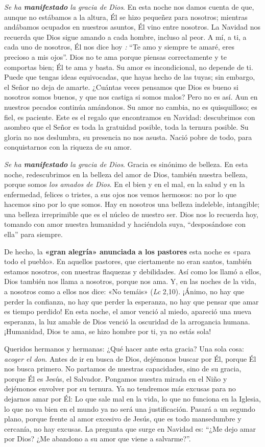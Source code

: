 \documentclass[]{article}
\begin{document}
\emph{Se ha \textbf{manifestado} la gracia de Dios}. En esta noche nos
damos cuenta de que, aunque no estábamos a la altura, Él se hizo
pequeñez para nosotros; mientras andábamos ocupados en nuestros asuntos,
Él vino entre nosotros. La Navidad nos recuerda que Dios sigue amando a
cada hombre, incluso al peor. A mí, a ti, a cada uno de nosotros, Él nos
dice hoy \emph{:} ``Te amo y siempre te amaré, eres precioso a mis
ojos''. Dios no te ama porque piensas correctamente y te comportas bien;
Él te ama y basta. Su amor es incondicional, no depende de ti. Puede que
tengas ideas equivocadas, que hayas hecho de las tuyas; sin embargo, el
Señor no deja de amarte. ¿Cuántas veces pensamos que Dios es bueno si
nosotros somos buenos, y que nos castiga si somos malos? Pero no es así.
Aun en nuestros pecados continúa amándonos. Su amor no cambia, no es
quisquilloso; es fiel, es paciente. Este es el regalo que encontramos en
Navidad: descubrimos con asombro que el Señor es toda la gratuidad
posible, toda la ternura posible. Su gloria no nos deslumbra, su
presencia no nos asusta. Nació pobre de todo, para conquistarnos con la
riqueza de su amor.

\emph{Se ha \textbf{manifestado} la gracia de Dios}. Gracia es sinónimo
de belleza. En esta noche, redescubrimos en la belleza del amor de Dios,
también nuestra belleza, porque somos \emph{los amados de Dios}. En el
bien y en el mal, en la salud y en la enfermedad, felices o tristes, a
sus ojos nos vemos hermosos: no por lo que hacemos sino por lo que
somos. Hay en nosotros una belleza indeleble, intangible; una belleza
irreprimible que es el núcleo de nuestro ser. Dios nos lo recuerda hoy,
tomando con amor nuestra humanidad y haciéndola suya, ``desposándose con
ella'' para siempre.

De hecho, la \textbf{«gran alegría» anunciada a los pastores} esta noche
es «para todo el pueblo». En aquellos pastores, que ciertamente no eran
santos, también estamos nosotros, con nuestras flaquezas y debilidades.
Así como los llamó a ellos, Dios también nos llama a nosotros, porque
nos ama. Y, en las noches de la vida, a nosotros como a ellos nos dice:
«No temáis» (\emph{Lc} 2,10). ¡Ánimo, no hay que perder la confianza, no
hay que perder la esperanza, no hay que pensar que amar es tiempo
perdido! En esta noche, el amor venció al miedo, apareció una nueva
esperanza, la luz amable de Dios venció la oscuridad de la arrogancia
humana. ¡Humanidad, Dios te ama, se hizo hombre por ti, ya no estás
sola!

Queridos hermanos y hermanas: ¿Qué hacer ante esta gracia? Una sola
cosa: \emph{acoger el don}. Antes de ir en busca de Dios, dejémonos
buscar por Él, porque Él nos busca primero. No partamos de nuestras
capacidades, sino de su gracia, porque Él es Jesús, el Salvador.
Pongamos nuestra mirada en el Niño y dejémonos envolver por su ternura.
Ya no tendremos más excusas para no dejarnos amar por Él: Lo que sale
mal en la vida, lo que no funciona en la Iglesia, lo que no va bien en
el mundo ya no será una justificación. Pasará a un segundo plano, porque
frente al amor excesivo de Jesús, que es todo mansedumbre y cercanía, no
hay excusas. La pregunta que surge en Navidad es: ``¿Me dejo amar por
Dios? ¿Me abandono a su amor que viene a salvarme?''.
\end{document}
